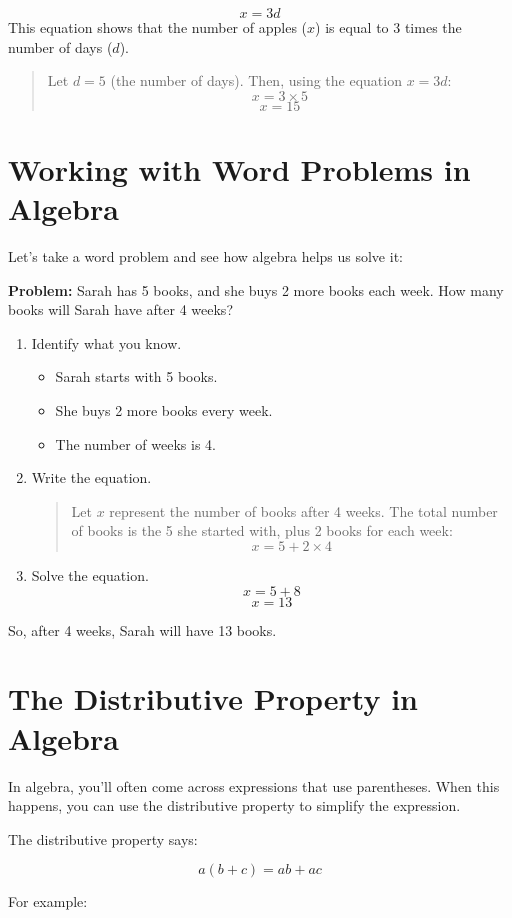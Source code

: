 \[ x = 3d \]
This equation shows that the number of apples ($x$) is equal to 3 times the number of days ($d$).

\begin{quote}
    Let $d = 5$ (the number of days).
    Then, using the equation $x = 3d$:
    \[ x = 3 \times 5 \]
    \[ x = 15 \]
\end{quote}

\section{Working with Word Problems in Algebra}
Let’s take a word problem and see how algebra helps us solve it:

\textbf{Problem:} Sarah has 5 books, and she buys 2 more books each week. How many books will Sarah have after 4 weeks?

\begin{enumerate}
    \item Identify what you know.
    \begin{itemize}
        \item Sarah starts with 5 books.
        \item She buys 2 more books every week.
        \item The number of weeks is 4.
    \end{itemize}
    \item Write the equation.
    \begin{quote}
    Let $x$ represent the number of books after 4 weeks.
    The total number of books is the 5 she started with, plus 2 books for each week:
    \[ x = 5 + 2 \times 4 \]
    \end{quote}
    \item Solve the equation.
    \[ x = 5 + 8 \]
    \[ x = 13 \]
\end{enumerate}

So, after 4 weeks, Sarah will have 13 books.

\section{The Distributive Property in Algebra}
In algebra, you’ll often come across expressions that use parentheses. When this happens, you can use the distributive property to simplify the expression.

The distributive property says:

\[ a(b + c) = ab + ac \]

For example:

